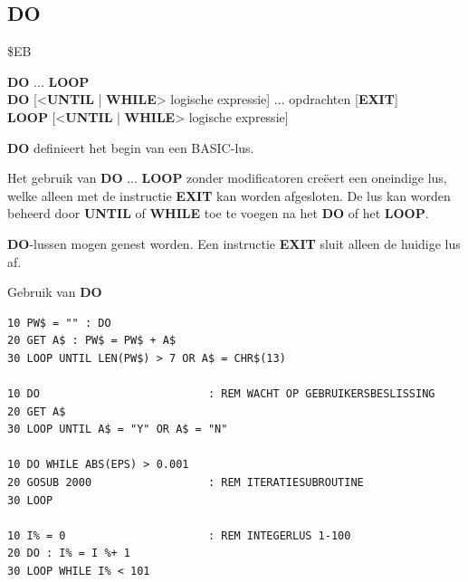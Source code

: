 
\newpage
\subsection{DO}
\begin{description}[leftmargin=2cm,style=nextline]
\item [Token:]    \$EB

\item [Formaat:]   {\bf DO} ... {\bf LOOP} \\                {\bf DO} [<{\bf UNTIL} | {\bf WHILE}> logische expressie] ... opdrachten [{\bf EXIT}] \\                  {\bf LOOP} [<{\bf UNTIL} | {\bf WHILE}> logische expressie]

\item [Gebruik:]    {\bf DO} definieert het begin van een BASIC-lus.

                  Het gebruik van {\bf DO} ... {\bf LOOP} zonder modificatoren creëert een oneindige lus, welke alleen met de instructie {\bf EXIT} kan worden afgesloten. De lus kan worden beheerd door {\bf UNTIL} of {\bf WHILE} toe te voegen na het {\bf DO} of het {\bf LOOP}.

\item [Opmerkingen:]  {\bf DO}-lussen mogen genest worden. Een instructie {\bf EXIT} sluit alleen de huidige lus af.

\item [Voorbeelden:] Gebruik van {\bf DO}

\begin{tcolorbox}[colback=black,coltext=white]
\verbatimfont{\codefont}
\begin{verbatim}
10 PW$ = "" : DO
20 GET A$ : PW$ = PW$ + A$
30 LOOP UNTIL LEN(PW$) > 7 OR A$ = CHR$(13)

10 DO                          : REM WACHT OP GEBRUIKERSBESLISSING
20 GET A$
30 LOOP UNTIL A$ = "Y" OR A$ = "N"

10 DO WHILE ABS(EPS) > 0.001
20 GOSUB 2000                  : REM ITERATIESUBROUTINE
30 LOOP

10 I% = 0                      : REM INTEGERLUS 1-100
20 DO : I% = I %+ 1
30 LOOP WHILE I% < 101
\end{verbatim}
\end{tcolorbox}
\end{description}


